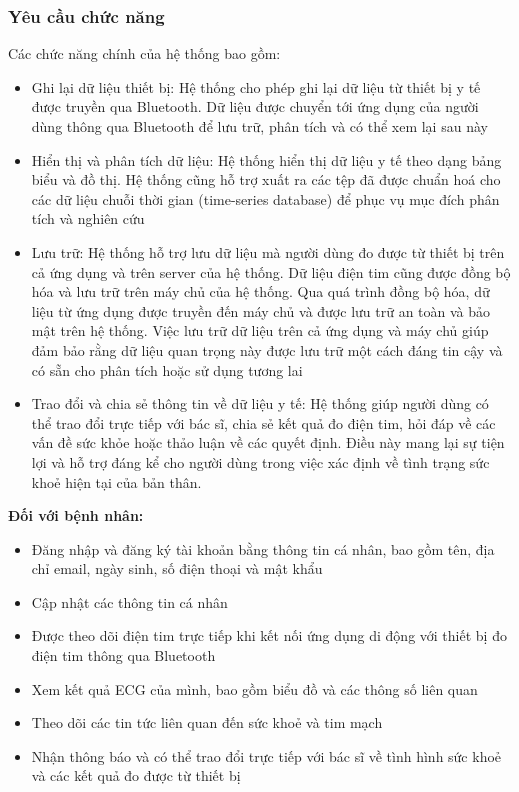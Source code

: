 \subsubsection{Yêu cầu chức năng}
Các chức năng chính của hệ thống bao gồm:
\begin{adjustwidth}{1.5em}{}
  \begin{itemize}
      \item Ghi lại dữ liệu thiết bị: Hệ thống cho phép ghi lại dữ liệu từ thiết bị y tế được truyền qua Bluetooth. Dữ liệu được chuyển tới ứng dụng của người dùng thông qua Bluetooth để lưu trữ, phân tích và có thể xem lại sau này
      \item Hiển thị và phân tích dữ liệu: Hệ thống hiển thị dữ liệu y tế theo dạng bảng biểu và đồ thị. Hệ thống cũng hỗ trợ xuất ra các tệp đã được chuẩn hoá cho các dữ liệu chuỗi thời gian (time-series database) để phục vụ mục đích phân tích và nghiên cứu
      \item Lưu trữ: Hệ thống hỗ trợ lưu dữ liệu mà người dùng đo được từ thiết bị trên cả ứng dụng và trên server của hệ thống. Dữ liệu điện tim cũng được đồng bộ hóa và lưu trữ trên máy chủ của hệ thống. Qua quá trình đồng bộ hóa, dữ liệu từ ứng dụng được truyền đến máy chủ và được lưu trữ an toàn và bảo mật trên hệ thống. Việc lưu trữ dữ liệu trên cả ứng dụng và máy chủ giúp đảm bảo rằng dữ liệu quan trọng này được lưu trữ một cách đáng tin cậy và có sẵn cho phân tích hoặc sử dụng tương lai
      \item Trao đổi và chia sẻ thông tin về dữ liệu y tế: Hệ thống giúp người dùng có thể trao đổi trực tiếp với bác sĩ, chia sẻ kết quả đo điện tim, hỏi đáp về các vấn đề sức khỏe hoặc thảo luận về các quyết định. Điều này mang lại sự tiện lợi và hỗ trợ đáng kể cho người dùng trong việc xác định về tình trạng sức khoẻ hiện tại của bản thân.

  \end{itemize}
\end{adjustwidth}
\textbf{Đối với bệnh nhân:}
\begin{adjustwidth}{1.5em}{}
\begin{itemize}
    \item Đăng nhập và đăng ký tài khoản bằng thông tin cá nhân, bao gồm tên, địa chỉ email, ngày sinh, số điện thoại và mật khẩu
    \item Cập nhật các thông tin cá nhân
    \item Được theo dõi điện tim trực tiếp khi kết nối ứng dụng di động với thiết bị đo điện tim thông qua Bluetooth
    \item Xem kết quả ECG của mình, bao gồm biểu đồ và các thông số liên quan
    \item Theo dõi các tin tức liên quan đến sức khoẻ và tim mạch
    \item Nhận thông báo và có thể trao đổi trực tiếp với bác sĩ về tình hình sức khoẻ và các kết quả đo được từ thiết bị
\end{itemize}
\end{adjustwidth}
